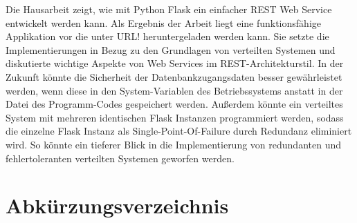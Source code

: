 \documentclass[a4paper,titlepage,halfparskip,12pt,listof=numbered]{scrreprt}
\begin{document}
\begin{onehalfspacing}
Die Hausarbeit zeigt, wie mit Python Flask ein einfacher \ac{REST} Web Service entwickelt werden kann. Als Ergebnis der Arbeit liegt eine funktionsfähige Applikation vor die unter URL! heruntergeladen werden kann. Sie setzte die Implementierungen in Bezug zu den Grundlagen von verteilten Systemen und diskutierte wichtige Aspekte von Web Services im \ac{REST}-Architekturstil. In der Zukunft könnte die Sicherheit der Datenbankzugangsdaten besser gewährleistet werden, wenn diese in den System-Variablen des Betriebssystems anstatt in der Datei des Programm-Codes gespeichert werden. Außerdem könnte ein verteiltes System mit mehreren identischen Flask Instanzen programmiert werden, sodass die einzelne Flask Instanz als Single-Point-Of-Failure durch Redundanz eliminiert wird. So könnte ein tieferer Blick in die Implementierung von redundanten und fehlertoleranten verteilten Systemen geworfen werden.


\end{onehalfspacing}

\newpage

\cleardoublepage
\appendix
{}

\cleardoublepage
\tableofcontents

\cleardoublepage
\listoffigures
\newpage

\cleardoublepage
\listoftables
\newpage

\cleardoublepage
\lstlistoflistings
\newpage

\cleardoublepage
\chapter{Abkürzungsverzeichnis}
\begin{acronym}[YTMMM]
\setlength{\itemsep}{-\parsep}
\end{acronym}
\end{document}
